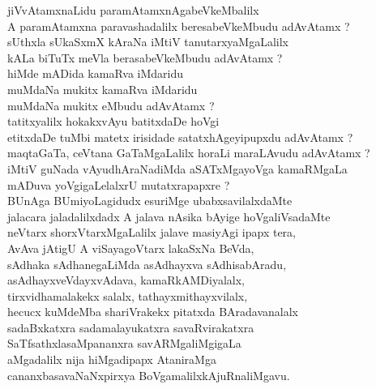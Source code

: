 \begin{entry}
\begin{shl}
\end{shl}
\end{entry}

\begin{entry}
\begin{shl}
jiVvAtamxnaLidu paramAtamxnAgabeVkeMbalilx\\
A paramAtamxna paravashadalilx beresabeVkeMbudu adAvAtamx ?\\
sUthxla sUkaSxmX kAraNa iMtiV tanutarxyaMgaLalilx\\
kALa biTuTx meVla berasabeVkeMbudu adAvAtamx ?\\
hiMde mADida kamaRva iMdaridu\\
muMdaNa mukitx kamaRva iMdaridu\\
muMdaNa mukitx eMbudu adAvAtamx ?\\
tatitxyalilx hokakxvAyu batitxdaDe hoVgi\\
etitxdaDe tuMbi matetx irisidade satatxhAgeyipupxdu adAvAtamx ?\\
maqtaGaTa, ceVtana GaTaMgaLalilx horaLi maraLAvudu adAvAtamx ?\\
iMtiV guNada vAyudhAraNadiMda aSATxMgayoVga kamaRMgaLa\\
mADuva yoVgigaLelalxrU mutatxrapapxre ?\\
BUnAga BUmiyoLagidudx esuriMge ubabxsavilalxdaMte\\
jalacara jaladalilxdadx A jalava nAsika bAyige hoVgaliVsadaMte\\
neVtarx shorxVtarxMgaLalilx jalave masiyAgi ipapx tera,\\
AvAva jAtigU A viSayagoVtarx lakaSxNa BeVda,\\
sAdhaka sAdhanegaLiMda asAdhayxva sAdhisabAradu,\\
asAdhayxveVdayxvAdava, kamaRkAMDiyalalx,\\
tirxvidhamalakekx salalx, tathayxmithayxvilalx,\\
hecucx kuMdeMba shariVrakekx pitatxda BAradavanalalx\\
sadaBxkatxra sadamalayukatxra savaRvirakatxra\\
SaTfsathxlasaMpananxra savARMgaliMgigaLa\\
aMgadalilx nija hiMgadipapx AtaniraMga\\
cananxbasavaNaNxpirxya BoVgamalilxkAjuRnaliMgavu.
\end{shl}
\end{entry}

